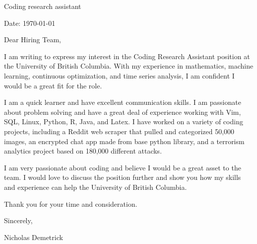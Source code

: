 \documentclass[11pt,a4]{article}
\begin{document}
	\begin{center}
		
		\begin{minipage}[b]{0.5\textwidth}
			\centering
			{\Huge Coding research assistant} \\ %
			\vspace{0.1cm}
			
		\end{minipage}%
		
		\vspace{-0.15cm} 
		{\color{UI_blue} \hrulefill}
	\end{center}
	
	\justify
	\setlength{\parindent}{0pt}
	\setlength{\parskip}{12pt}
	\vspace{0.2cm}
	
	Date: \today \par \vspace{-0.1cm}
Dear Hiring Team,

I am writing to express my interest in the Coding Research Assistant position at the University of British Columbia. With my experience in mathematics, machine learning, continuous optimization, and time series analysis, I am confident I would be a great fit for the role.

I am a quick learner and have excellent communication skills. I am passionate about problem solving and have a great deal of experience working with Vim, SQL, Linux, Python, R, Java, and Latex. I have worked on a variety of coding projects, including a Reddit web scraper that pulled and categorized 50,000 images, an encrypted chat app made from base python library, and a terrorism analytics project based on 180,000 different attacks.

I am very passionate about coding and believe I would be a great asset to the team. I would love to discuss the position further and show you how my skills and experience can help the University of British Columbia.

Thank you for your time and consideration.

Sincerely,

Nicholas Demetrick \vspace{0.5cm} \raggedright 
\end{document}
